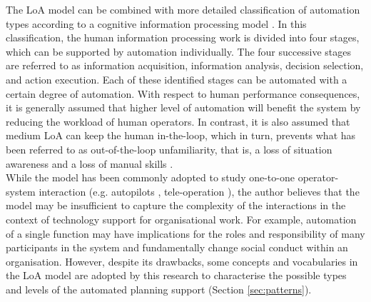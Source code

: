 The \ac{LoA} model can be combined with more detailed classification of automation types according to a cognitive information processing model \citep{Parasuraman2000,Manzey2012}. In this classification,  the human information processing work is divided into four stages, which can be supported by automation individually. The four successive stages are referred to as information acquisition, information analysis, decision selection, and action execution. Each of these identified stages can be automated with a certain degree of automation. With respect to human performance consequences, it is generally assumed that higher level of automation will benefit the system by reducing the workload of human operators. In contrast, it is also assumed that medium \ac{LoA} can keep the human in-the-loop, which in turn, prevents what has been referred to as out-of-the-loop unfamiliarity, that is, a loss of situation awareness and a loss of manual skills \citep{Kaber1997,Parasuraman2010}.\\

While the model has been commonly adopted to study one-to-one operator-system interaction (e.g. autopilots \citep{Calhoun2011}, tele-operation \citep{Schwarz2014}), the author believes that the model may be insufficient to capture the complexity of the interactions in the context of technology support for organisational work. For example, automation of a single function may have implications for the roles and responsibility of many participants in the system and fundamentally change social conduct within an organisation. However, despite its drawbacks, some concepts and vocabularies in the \ac{LoA} model are adopted by this research to characterise the possible types and levels of the automated planning support (Section \ref{sec:patterns}).\\

